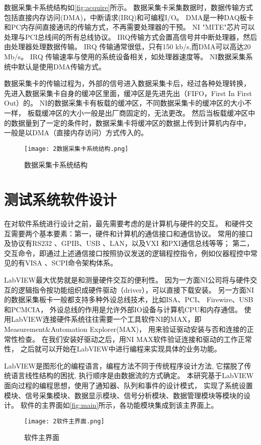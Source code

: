 数据采集卡系统结构如\autoref{fig:acquire}所示。
数据采集卡采集数据时，数据传输方式包括直接内存访问(DMA)，中断请求(IRQ)和可编程I/O。
DMA是一种DAQ板卡和PC内存间直接通讯的传输方式，不再需要处理器的干预。
NI "MITE"芯片可以处理与PCI总线间的所有总线协议。
IRQ传输方式会置高信号并中断处理器，然后由处理器处理数据传输。
IRQ  传输通常很低，只有150 kb/s,而DMA可以高达20 Mb/s。
IRQ 传输速率与使用的系统设备相关，如处理器速度等。
NI数据采集系统中默认是使用DMA传输方式。

数据采集卡的传输过程为，外部的信号进入数据采集卡后，经过各种处理转换，
先进入数据采集卡自身的缓冲区里面，缓冲区是先进先出（FIFO，First In First Out）的。
NI的数据采集卡有板载的缓冲区，不同数据采集卡的缓冲区的大小不一样，
板载缓冲区的大小一般是出厂商固定的，无法更改。
然后当板载缓冲区中的数据量到了一定的条件时，数据采集卡将缓冲区的数据上传到计算机内存中，
一般是以DMA（直接内存访问）方式传入的。

\begin{figure}[htbp]
    \centering
    \texttt{[image: 2数据采集卡系统结构.png]}
    \caption{\label{fig:acquire}数据采集卡系统结构}
\end{figure}

\section{测试系统软件设计}
在对软件系统进行设计之前，最先需要考虑的是计算机与硬件的交互。
和硬件交互需要两个基本要素：第一，硬件和计算机的通信接口和通信协议。
常用的接口及协议有RS232 、GPIB、USB 、LAN，以及VXI 和PXI通信总线等等；
第二，交互命令，即通过上述通信接口按照协议发送的逻辑程控指令，例如仪器程控中常见的有VISA 、SCPI命令架构体系。

LabVIEW最大优势就是和测量硬件交互的便利性。
因为一方面NI公司将与硬件交互的逻辑指令按功能组织成硬件驱动（driver），可以直接下载安装。
另一方面NI的数据采集板卡一般都支持多种外设总线技术，比如ISA、PCI、 Firewire、USB 和PCMCIA，
外设总线的作用是允许外部IO设备与计算机CPU和内存通信。
使用LabVIEW连接硬件系统往往需要一个工具软件NI的MAX，即Measurement\&Automation Explorer(MAX)，
用来验证驱动安装与否和连接的正常性检查。
在我们安装好驱动之后，用NI MAX软件验证连接和驱动的工作正常性，
之后就可以开始在LabVIEW中进行编程来实现具体的业务功能。

LabVIEW是图形化的编程语言，编程方法不同于传统程序设计方法, 它摆脱了传统语言线性结构的困扰, 
执行顺序是由数据流的方式确定。
本研究基于LabVIEW面向过程的编程思想，使用了通知器、队列和事件的设计模式，
实现了系统设置模块、信号采集模块、数据显示模块、信号分析模块、数据管理模块等模块的设计。
软件的主界面如\autoref{fig:main}所示，各功能模块集成到该主界面上。
\begin{figure}[htbp]
    \centering
    \texttt{[image: 2软件主界面.png]}
    \caption{\label{fig:main}软件主界面}
\end{figure}

